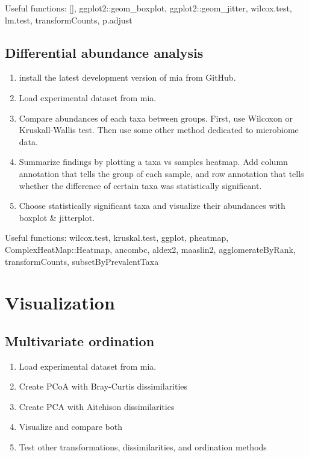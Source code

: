 \documentclass[
]{book}
\providecommand{\tightlist}{%
  \setlength{\itemsep}{0pt}\setlength{\parskip}{0pt}}
\begin{document}
Useful functions: {[}{]}, ggplot2::geom\_boxplot, ggplot2::geom\_jitter, wilcox.test, lm.test, transformCounts, p.adjust

\hypertarget{differential-abundance-analysis-1}{%
\subsection{Differential abundance analysis}\label{differential-abundance-analysis-1}}

\begin{enumerate}
\def\labelenumi{\arabic{enumi}.}
\tightlist
\item
  install the latest development version of mia from GitHub.
\item
  Load experimental dataset from mia.
\item
  Compare abundances of each taxa between groups. First, use Wilcoxon or Kruskall-Wallis test. Then use some other method dedicated to microbiome data.
\item
  Summarize findings by plotting a taxa vs samples heatmap. Add column annotation that tells the group of each sample, and row annotation that tells whether the difference of certain taxa was statistically significant.
\item
  Choose statistically significant taxa and visualize their abundances with boxplot \& jitterplot.
\end{enumerate}

Useful functions: wilcox.test, kruskal.test, ggplot, pheatmap, ComplexHeatMap::Heatmap, ancombc, aldex2, maaslin2, agglomerateByRank, transformCounts, subsetByPrevalentTaxa

\hypertarget{visualization-2}{%
\section{Visualization}\label{visualization-2}}

\hypertarget{multivariate-ordination}{%
\subsection{Multivariate ordination}\label{multivariate-ordination}}

\begin{enumerate}
\def\labelenumi{\arabic{enumi}.}
\tightlist
\item
  Load experimental dataset from mia.
\item
  Create PCoA with Bray-Curtis dissimilarities
\item
  Create PCA with Aitchison dissimilarities
\item
  Visualize and compare both
\item
  Test other transformations, dissimilarities, and ordination methods
\end{enumerate}
\end{document}
